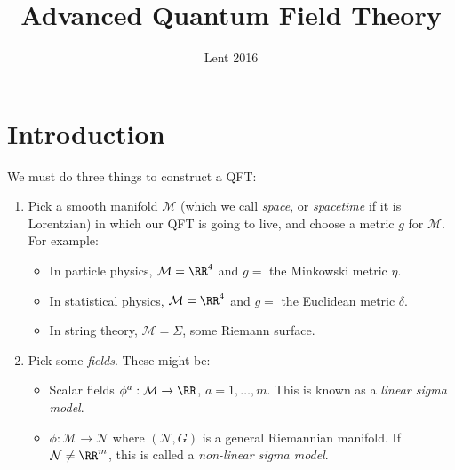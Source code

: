 \documentclass{jknotes}
\begin{document}
\title{Advanced Quantum Field Theory}
\date{Lent 2016}

\maketitle
\suggestionsspiel
\tableofcontents

\section{Introduction}
We must do three things to construct a QFT:
\begin{enumerate}
    \item Pick a smooth manifold \(\mathcal{M}\) (which we call \emph{space}, or \emph{spacetime} if it is Lorentzian) in which our QFT is going to live, and choose a metric \(g\) for \(\mathcal{M}\).
        For example:
        \begin{itemize}
            \item In particle physics, \(\mathcal{M}=\RR^4\) and \(g=\) the Minkowski metric \(\eta\).
            \item In statistical physics, \(\mathcal{M}=\RR^4\) and \(g=\) the Euclidean metric \(\delta\).
            \item In string theory, \(\mathcal{M}=\Sigma\), some Riemann surface.
        \end{itemize}
    \item Pick some \emph{fields}. These might be:
        \begin{itemize}
            \item Scalar fields \(\phi^a:\mathcal{M}\rightarrow\RR\), \(a=1,\dots,m\). This is known as a \emph{linear sigma model}.
            \item \(\phi:\mathcal{M}\rightarrow\mathcal{N}\) where \((\mathcal{N},G)\) is a general Riemannian manifold. If \(\mathcal{N}\ne \RR^m\), this is called a \emph{non-linear sigma model}.
                \begin{figure}[H]
                    \centering
\end{figure}
\end{itemize}
\end{enumerate}
\end{document}
